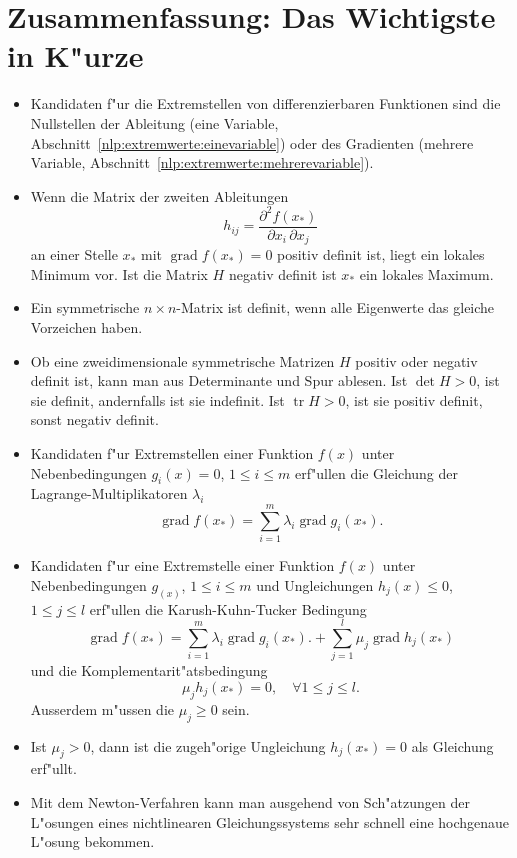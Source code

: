 \section{Zusammenfassung: Das Wichtigste in K"urze}
\begin{itemize}
\item Kandidaten f"ur die Extremstellen von differenzierbaren
Funktionen sind die Nullstellen der Ableitung (eine Variable,
Abschnitt~\ref{nlp:extremwerte:einevariable})
oder des Gradienten (mehrere Variable,
Abschnitt~\ref{nlp:extremwerte:mehrerevariable}).
\item Wenn die Matrix der zweiten Ableitungen
\[
h_{ij}=
\frac{\partial^2f(x_*)}{\partial x_i\,\partial x_j}
\]
an einer Stelle $x_*$ mit $\operatorname{grad}f(x_*)=0$
positiv definit ist, liegt ein lokales Minimum vor. Ist die Matrix $H$
negativ definit ist $x_*$ ein lokales Maximum.
\item Ein symmetrische $n\times n$-Matrix ist definit, wenn alle
Eigenwerte das gleiche Vorzeichen haben.
\item Ob eine zweidimensionale symmetrische Matrizen $H$ positiv oder negativ
definit ist, kann man aus Determinante und Spur ablesen.
Ist $\det H >0$, ist sie definit, andernfalls ist sie indefinit.
Ist $\operatorname{tr}H>0$, ist sie positiv definit, sonst negativ
definit.
\item Kandidaten f"ur Extremstellen einer Funktion $f(x)$ unter
Nebenbedingungen $g_i(x)=0$, $1\le i\le m$ erf"ullen die 
Gleichung der Lagrange-Multiplikatoren $\lambda_i$
\[
\operatorname{grad}f(x_*)=\sum_{i=1}^m\lambda_i\operatorname{grad}g_i(x_*).
\]
\item Kandidaten f"ur eine Extremstelle einer Funktion $f(x)$ unter
Nebenbedingungen $g_(x)$, $1\le i\le m$ und Ungleichungen $h_j(x)\le 0$,
$1\le j\le l$ erf"ullen die Karush-Kuhn-Tucker Bedingung
\[
\operatorname{grad}f(x_*)=\sum_{i=1}^m\lambda_i\operatorname{grad}g_i(x_*).
+\sum_{j=1}^l\mu_j\operatorname{grad}h_j(x_*)
\]
und die Komplementarit"atsbedingung
\[
\mu_jh_j(x_*)=0,\quad\forall 1\le j\le l.
\]
Ausserdem m"ussen die $\mu_j\ge0$ sein.
\item Ist $\mu_j>0$, dann ist die zugeh"orige Ungleichung $h_j(x_*)=0$
als Gleichung erf"ullt.
\item Mit dem Newton-Verfahren kann man ausgehend von Sch"atzungen
der L"osungen eines nichtlinearen Gleichungssystems sehr schnell
eine hochgenaue L"osung bekommen.
\end{itemize}
